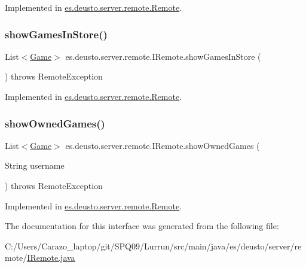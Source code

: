 Implemented in \hyperlink{classes_1_1deusto_1_1server_1_1remote_1_1_remote_a5a130e99a06078d7d6fe186597e91d41}{es.\+deusto.\+server.\+remote.\+Remote}.

\mbox{\label{interfacees_1_1deusto_1_1server_1_1remote_1_1_i_remote_a091249da31b567c1be29e07085d3ff18}} 
\subsubsection{\texorpdfstring{show\+Games\+In\+Store()}{showGamesInStore()}}
{\footnotesize\ttfamily List$<$\hyperlink{classes_1_1deusto_1_1server_1_1db_1_1data_1_1_game}{Game}$>$ es.\+deusto.\+server.\+remote.\+I\+Remote.\+show\+Games\+In\+Store (\begin{DoxyParamCaption}{ }\end{DoxyParamCaption}) throws Remote\+Exception}



Implemented in \hyperlink{classes_1_1deusto_1_1server_1_1remote_1_1_remote_ae40a5882d6b3ef3d5928d87dafeb15fa}{es.\+deusto.\+server.\+remote.\+Remote}.

\mbox{\label{interfacees_1_1deusto_1_1server_1_1remote_1_1_i_remote_aaaf6af5906c81cbd7b3b190a70ead98b}} 
\subsubsection{\texorpdfstring{show\+Owned\+Games()}{showOwnedGames()}}
{\footnotesize\ttfamily List$<$\hyperlink{classes_1_1deusto_1_1server_1_1db_1_1data_1_1_game}{Game}$>$ es.\+deusto.\+server.\+remote.\+I\+Remote.\+show\+Owned\+Games (\begin{DoxyParamCaption}\item[{String}]{username }\end{DoxyParamCaption}) throws Remote\+Exception}



Implemented in \hyperlink{classes_1_1deusto_1_1server_1_1remote_1_1_remote_a73569877f9317fc48a4e134977baa304}{es.\+deusto.\+server.\+remote.\+Remote}.



The documentation for this interface was generated from the following file\+:\begin{DoxyCompactItemize}
\item 
C\+:/\+Users/\+Carazo\+\_\+laptop/git/\+S\+P\+Q09/\+Lurrun/src/main/java/es/deusto/server/remote/\hyperlink{_i_remote_8java}{I\+Remote.\+java}\end{DoxyCompactItemize}

